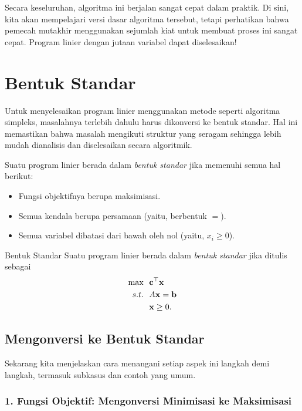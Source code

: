 Secara keseluruhan, algoritma ini berjalan sangat cepat dalam praktik. Di sini, kita akan mempelajari versi dasar algoritma tersebut, tetapi perhatikan bahwa pemecah mutakhir menggunakan sejumlah kiat untuk membuat proses ini sangat cepat. Program linier dengan jutaan variabel dapat diselesaikan!

\section{Bentuk Standar}
\label{sec:standard-form}

Untuk menyelesaikan program linier menggunakan metode seperti algoritma simpleks, masalahnya terlebih dahulu harus dikonversi ke bentuk standar. Hal ini memastikan bahwa masalah mengikuti struktur yang seragam sehingga lebih mudah dianalisis dan diselesaikan secara algoritmik.

Suatu program linier berada dalam \emph{bentuk standar} jika memenuhi semua hal berikut:
\begin{itemize}
    \item Fungsi objektifnya berupa maksimisasi.
    \item Semua kendala berupa persamaan (yaitu, berbentuk \( = \)).
    \item Semua variabel dibatasi dari bawah oleh nol (yaitu, \( x_i \geq 0 \)).
\end{itemize}

\begin{definition}{Bentuk Standar}\label{def:standardform}
Suatu program linier berada dalam \emph{bentuk standar} jika ditulis sebagai
\begin{align*}
\max \ \ &\mathbf{c}^\top \mathbf{x} \\
s.t. \ \ & A\mathbf{x} = \mathbf{b}\\
& \mathbf{x} \geq 0.
\end{align*}
\end{definition}

\subsection{Mengonversi ke Bentuk Standar}
Sekarang kita menjelaskan cara menangani setiap aspek ini langkah demi langkah, termasuk subkasus dan contoh yang umum.

\subsubsection*{1. Fungsi Objektif: Mengonversi Minimisasi ke Maksimisasi}

